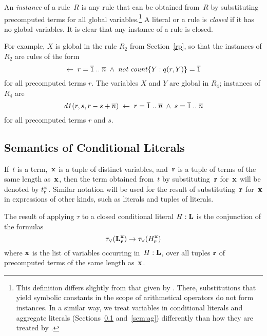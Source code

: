 \documentclass{tlp}
\def\ar{\leftarrow}
\def\rar{\rightarrow}
\def\no{{\it not}}
\begin{document}
An {\sl instance} of a rule~$R$ is any
rule that can be obtained from~$R$ by substituting
precomputed terms for all global variables.\footnote{\label{ft2} This
definition
differs slightly from that given by 
\citeyear[Section~3.3]{har14a}. There,
substitutions that yield symbolic constants in the scope of arithmetical
operators do not form instances.
In a similar way, we treat variables in conditional literals
and aggregate literals (Sections~\ref{sem:cond} and~\ref{sem:ag}) differently
than how they are treated by  \citeyear{har14a}.}
A literal or a rule is {\sl closed} if
it has no global variables. It is clear that any instance of a rule is closed.

For example, $X$ is global in the rule $R_2$ from Section~\ref{rp},
so that the instances of $R_2$ are rules of the form
$$
\ar \; r = \overline 1\;..\;\overline n \; \land \; \no \; {\it count}\{ Y : q(r,Y) \} = \overline 1
$$
for all precomputed terms $r$.
The variables $X$ and $Y$ are global in $R_4$; instances of $R_4$ are
$$
{\it d1}(r, s, r- s+\overline n) \; \ar \;  r = \overline 1\;..\;\overline n \; \land \;
 s = \overline 1\;..\;\overline n
$$
for all precomputed terms $r$ and $s$.
\subsection{Semantics of Conditional Literals}\label{sem:cond}

If~$t$ is a term,~${\bf x}$ is a tuple of distinct variables, and~${\bf r}$ is
a tuple of terms of the same length as~${\bf x}$, then the term obtained
from~$t$ by substituting~${\bf r}$
for~${\bf x}$ will be denoted by $t^{\bf x}_{\bf r}$.  Similar notation will be
used for the result of substituting~${\bf r}$ for~${\bf x}$ in expressions of
other kinds, such as literals and tuples of literals.

The result of applying $\tau$ to a closed conditional literal $H : {\bf L}$
is the conjunction of the formulas
$$\tau_{\lor} ({\bf L}^{\bf x}_{\bf r})\rar \tau_{\lor}(H^{\bf x}_{\bf r})$$
where ${\bf x}$ is the list of variables occurring in~$H : {\bf L}$,
over all tuples ${\bf r}$ of precomputed terms of the same length as~${\bf
x}$.
\end{document}
